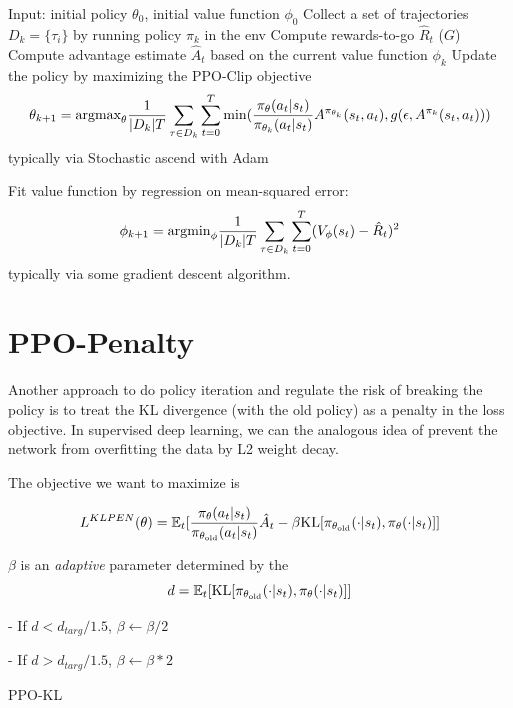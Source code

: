 \documentclass{article}
\begin{document}
\begin{algorithmic}[1]
\STATE Input: initial policy $\theta_0$, initial value function $\phi_0$
\STATE Collect a set of trajectories $D_k = \{\tau_i\}$ by running policy
$\pi_k$ in the env
\STATE Compute rewards-to-go $\hat R_t$ ($G$)
\STATE Compute advantage estimate $\hat A_t$ based on the current
value function $\phi_k$
\STATE Update the policy by maximizing the PPO-Clip objective
\[
\theta_{k+1} = \text{argmax}_{\theta} \frac{1}{|D_k|T}
\sum_{\tau \in D_k}\sum_{t=0}^T \min(
\frac{\pi_{\theta}(a_t | s_t)}{\pi_{\theta_k}(a_t|s_t)}
A^{\pi_{\theta_k}}(s_t, a_t), g(\epsilon, A^{\pi_k}(s_t, a_t)))
\]
typically via Stochastic ascend with Adam

\STATE Fit value function by regression on mean-squared error:
\[
\phi_{k+1} = \text{argmin}_{\phi}\frac{1}{|D_k|T}
\sum_{\tau \in D_k}\sum_{t=0}^T(V_{\phi}(s_t) - \hat R_t)^2
\]
typically via some gradient descent algorithm. 
\ENDFOR
\end{algorithmic}

\section{PPO-Penalty}
Another approach to do policy iteration and regulate the risk of breaking
the policy is to treat the KL divergence (with the old policy) as a 
penalty in the loss objective. In supervised deep learning, we can the
analogous idea of prevent the network from overfitting the data by L2 
weight decay. 

The objective we want to maximize is 

\[
L^{KLPEN}(\theta) = \mathbb{E}_{t}[
\frac{\pi_{\theta}(a_t|s_t)}{\pi_{\theta_{\text{old}}}(a_t | s_t)}\hat A_t
- \beta \text{KL}[\pi_{\theta_{\text{old}}}(\cdot | s_t), \pi_{\theta}(\cdot|s_t)]
]
\]

$\beta$ is an \emph{adaptive} parameter determined by the 
\[
d = \mathbb{E}_t[\text{KL}[\pi_{\theta_{\text{old}}}(\cdot | s_t), \pi_{\theta}(\cdot | s_t)]]
\]

- If $d < d_{targ}/1.5$, $\beta \leftarrow \beta/2$

- If $d > d_{targ}/1.5$, $\beta \leftarrow \beta * 2$



\begin{algorithm}[H]
\caption{PPO-KL}
\label{alg2}
\end{algorithm}
\end{document}

